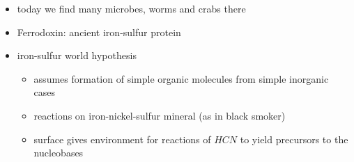 \documentclass{article}
\theoremstyle{sltheorem}
\begin{document}
\begin{itemize}
    \item today we find many microbes, worms and crabs there
    \item Ferrodoxin: ancient iron-sulfur protein
    \item iron-sulfur world hypothesis
    \begin{itemize}
        \item assumes formation of simple organic molecules from simple inorganic cases
        \item reactions on iron-nickel-sulfur mineral (as in black smoker)
        \item surface gives environment for reactions of $HCN$ to yield precursors to the nucleobases
    \end{itemize}
\end{itemize}
\end{document}
